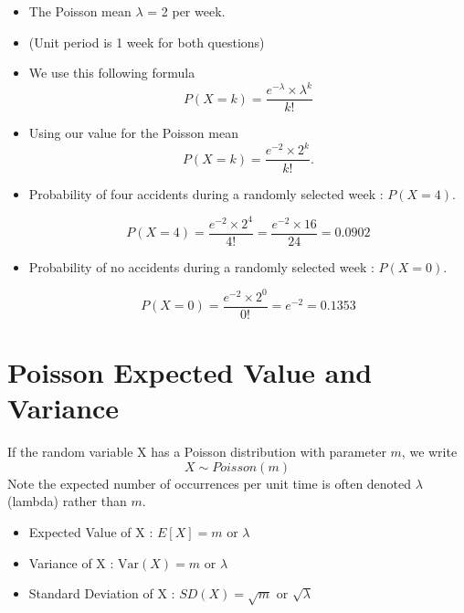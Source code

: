 \documentclass[a4paper,12pt]{article}
\begin{document}
\begin{itemize}
	\item The Poisson mean $\lambda$ = 2  per week.
	\item (Unit period is 1 week for both questions)
	\item We use this following formula
	\[ P(X=k) =  \frac{e^{-\lambda} \times \lambda ^k}{k!}  \]
	\item Using our value for the Poisson mean
	\[ P(X=k) =  \frac{e^{-2} \times 2^k}{k!} . \]
	
	\item Probability of four accidents during a randomly selected week : $ P(X = 4)$.
	
	\[ P(X=4) =  \frac{e^{-2} \times 2^4}{4!} = \frac{e^{-2} \times 16}{24} = 0.0902\]
	
	\item Probability of no accidents during a randomly selected week : $ P(X = 0)$.
	
	\[ P(X=0) =  \frac{e^{-2} \times 2^0}{0!} = e^{-2} = 0.1353  \]
	
	
\end{itemize}



\newpage
\section*{Poisson Expected Value and Variance}


If the random variable X has a Poisson distribution with parameter $m$, we write
\[ X \sim Poisson(m) \]
Note the expected number of occurrences per unit time is often denoted $\lambda$ (lambda) rather than $m$.

% 




\begin{itemize}
	\item Expected Value of X : $E[X]=  m \mbox{ or } \lambda$
	\item Variance of X : $\mbox{Var}(X) = m \mbox{ or } \lambda$
	\item Standard Deviation of X : $SD(X) = \sqrt{m} \mbox{ or } \sqrt{\lambda}$
\end{itemize}
\end{document}
